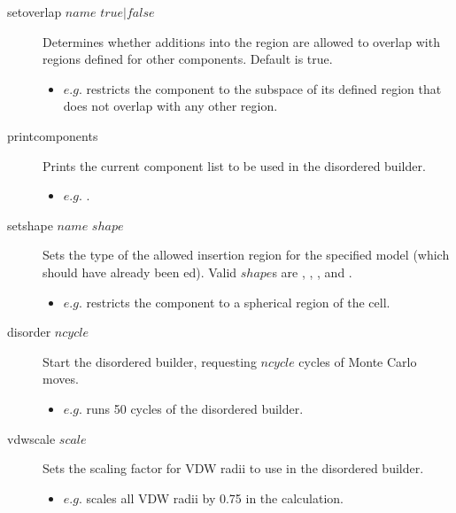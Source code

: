 \begin{description}
	\item[setoverlap $name$ $true|false$\its] Determines whether additions into the region are allowed to overlap with regions defined for other components. Default is true.
	\begin{itemize}
		\item $e.g.$  restricts the  component to the subspace of its defined region that does not overlap with any other region.
	\end{itemize}

	\item[printcomponents\its] Prints the current component list to be used in the disordered builder.
	\begin{itemize}
		\item $e.g.$ .
	\end{itemize}

	\item[setshape $name$ $shape$\its] Sets the type of the allowed insertion region for the specified model (which should have already been ed). Valid $shape$s are , , , and .
	\begin{itemize}
		\item $e.g.$  restricts the component  to a spherical region of the cell.
	\end{itemize}

	\item[disorder $ncycle$\its] Start the disordered builder, requesting $ncycle$ cycles of Monte Carlo moves.
	\begin{itemize}
		\item $e.g.$  runs 50 cycles of the disordered builder.
	\end{itemize}

	\item[vdwscale $scale$\its] Sets the scaling factor for VDW radii to use in the disordered builder.
	\begin{itemize}
		\item $e.g.$  scales all VDW radii by 0.75 in the calculation.
	\end{itemize}

\end{description}

